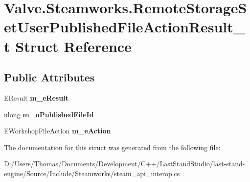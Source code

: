 \hypertarget{structValve_1_1Steamworks_1_1RemoteStorageSetUserPublishedFileActionResult__t}{}\section{Valve.\+Steamworks.\+Remote\+Storage\+Set\+User\+Published\+File\+Action\+Result\+\_\+t Struct Reference}
\label{structValve_1_1Steamworks_1_1RemoteStorageSetUserPublishedFileActionResult__t}
\subsection*{Public Attributes}
\begin{DoxyCompactItemize}
\item 
\hypertarget{structValve_1_1Steamworks_1_1RemoteStorageSetUserPublishedFileActionResult__t_ae3681e9c8e3564e8f81fc51d40fc83c9}{}E\+Result {\bfseries m\+\_\+e\+Result}\label{structValve_1_1Steamworks_1_1RemoteStorageSetUserPublishedFileActionResult__t_ae3681e9c8e3564e8f81fc51d40fc83c9}

\item 
\hypertarget{structValve_1_1Steamworks_1_1RemoteStorageSetUserPublishedFileActionResult__t_a4f52b3e162852769a17d2644a918188b}{}ulong {\bfseries m\+\_\+n\+Published\+File\+Id}\label{structValve_1_1Steamworks_1_1RemoteStorageSetUserPublishedFileActionResult__t_a4f52b3e162852769a17d2644a918188b}

\item 
\hypertarget{structValve_1_1Steamworks_1_1RemoteStorageSetUserPublishedFileActionResult__t_aaa0d45d221dcb1c6c882397af2ab0e73}{}E\+Workshop\+File\+Action {\bfseries m\+\_\+e\+Action}\label{structValve_1_1Steamworks_1_1RemoteStorageSetUserPublishedFileActionResult__t_aaa0d45d221dcb1c6c882397af2ab0e73}

\end{DoxyCompactItemize}


The documentation for this struct was generated from the following file\+:\begin{DoxyCompactItemize}
\item 
D\+:/\+Users/\+Thomas/\+Documents/\+Development/\+C++/\+Last\+Stand\+Studio/last-\/stand-\/engine/\+Source/\+Include/\+Steamworks/steam\+\_\+api\+\_\+interop.\+cs\end{DoxyCompactItemize}
